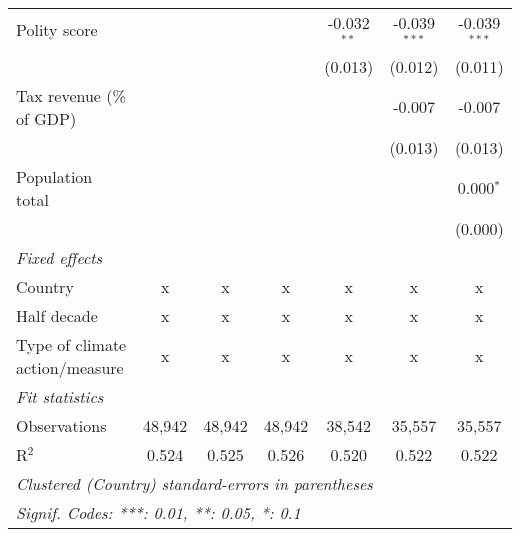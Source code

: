 \begin{tabular}{lcccccc}
   Polity score                                                             &         &               &                & -0.032$^{**}$  & -0.039$^{***}$ & -0.039$^{***}$\\   
                                                                            &         &               &                & (0.013)        & (0.012)        & (0.011)\\   
   Tax revenue (\% of GDP)                                                  &         &               &                &                & -0.007         & -0.007\\   
                                                                            &         &               &                &                & (0.013)        & (0.013)\\   
   Population total                                                         &         &               &                &                &                & 0.000$^{*}$\\   
                                                                            &         &               &                &                &                & (0.000)\\   
   \emph{Fixed effects}\\
   Country                                                                  & x       & x             & x              & x              & x              & x\\  
   Half decade                                                              & x       & x             & x              & x              & x              & x\\  
   Type of climate action/measure                                           & x       & x             & x              & x              & x              & x\\  
   \midrule \emph{Fit statistics}\\
   Observations                                                             & 48,942  & 48,942        & 48,942         & 38,542         & 35,557         & 35,557\\  
   R$^2$                                                                    & 0.524   & 0.525         & 0.526          & 0.520          & 0.522          & 0.522\\  
   \midrule
   \multicolumn{7}{l}{\emph{Clustered (Country) standard-errors in parentheses}}\\
   \multicolumn{7}{l}{\emph{Signif. Codes: ***: 0.01, **: 0.05, *: 0.1}}\\
\end{tabular}
\par\endgroup


